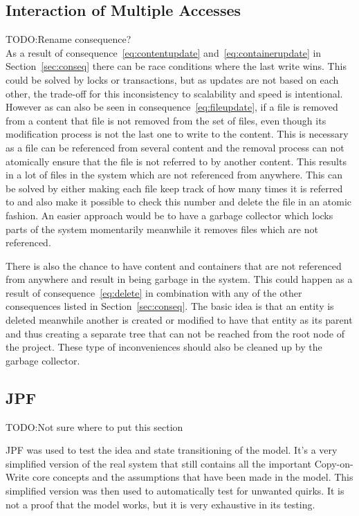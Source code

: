 \documentclass[a4paper,12pt]{article}
\newcommand{\fix}{\colorbox{yellow!30}{TODO:}}
\begin{document}
\subsection{Interaction of Multiple Accesses} \label{sec:multiple_access}
\fix Rename consequence?
\\
As a result of consequence~\ref{eq:contentupdate} and~\ref{eq:containerupdate} in
Section~\ref{sec:conseq} there can be race conditions where the last write wins. This could be
solved by locks or transactions, but as updates are not based on each other, the trade-off for this
inconsistency to scalability and speed is intentional. However as can also be seen in
consequence~\ref{eq:fileupdate}, if a file is removed from a content that file is not removed from
the set of files, even though its modification process is not the last one to write to the content.
This is necessary as a file can be referenced from several content and the removal process can not
atomically ensure that the file is not referred to by another content. This results in a lot of
files in the system which are not referenced from anywhere. This can be solved by either making each
file keep track of how many times it is referred to and also make it possible to check this number
and delete the file in an atomic fashion. An easier approach would be to have a garbage collector
which locks parts of the system momentarily meanwhile it removes files which are not referenced. 

\par
There is also the chance to have content and containers that are not referenced from anywhere and
result in being garbage in the system. This could happen as a result of consequence~\ref{eq:delete}
in combination with any of the other consequences listed in Section~\ref{sec:conseq}. The basic idea
is that an entity is deleted meanwhile another is created or modified to have that entity as its
parent and thus creating a separate tree that can not be reached from the root node of the project.
These type of inconveniences should also be cleaned up by the garbage collector.

\subsection{JPF}
\fix Not sure where to put this section

JPF was used to test the idea and state transitioning of the model. It's a very simplified
version of the real system that still contains all the important Copy-on-Write core concepts and the 
assumptions that have been made in the model. This simplified version was then used to automatically
test for unwanted quirks. It is not a proof that the model works, but it is very exhaustive in its
testing.
\end{document}
